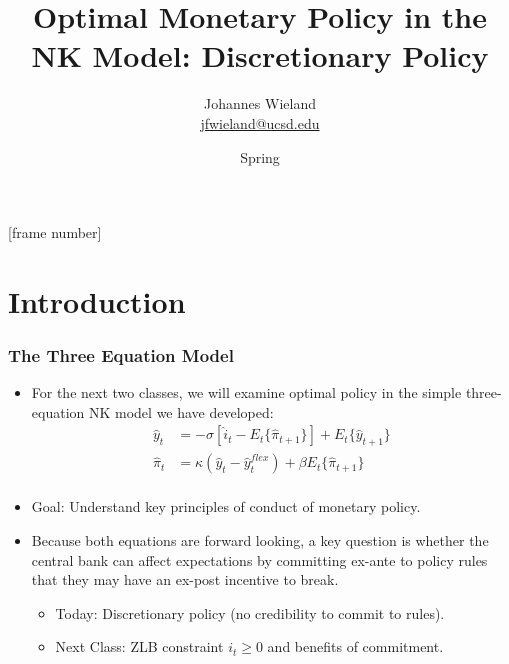 \documentclass[english,xcolor=svgnames]{beamer}
\begin{document}
\title{Optimal Monetary Policy in the NK Model: Discretionary Policy}
\vspace{1cm}
\author[shortname]{
\begin{tabular}{c}
	Johannes Wieland \\ 
	\footnotesize \href{mailto:jfwieland@ucsd.edu}{jfwieland@ucsd.edu}  \\ 
\end{tabular}
}

\date{Spring \the\year}

\makebeamertitle
{}[frame number]{}

\addtocounter{framenumber}{-1}




\section{Introduction}

\begin{frame}
\frametitle{The Three Equation Model}
\begin{itemize}
	\item For the next two classes, we will examine optimal policy in the simple three-equation NK model we have developed:
	\begin{align*}
		\hat{y}_t &=-\sigma[\hat{i}_t-E_t\{\hat{\pi}_{t+1}\}]+E_t\{\hat{y}_{t+1}\} \\
		\hat{\pi}_t&=\kappa (\hat{y}_t-\hat{y}_t^{flex}) +\beta E_t \{\hat{\pi}_{t+1}\} \\
	\end{align*}
	\item Goal: Understand key principles of conduct of monetary policy.
	\item Because both equations are forward looking, a key question is whether the central bank can affect expectations by committing ex-ante to policy rules that they may have an ex-post incentive to break.
	\begin{itemize}
		\item Today: Discretionary policy (no credibility to commit to rules).
		\item Next Class: ZLB constraint $i_t\ge 0$ and benefits of commitment.
	\end{itemize}
\end{itemize}
\end{frame}
\end{document}
